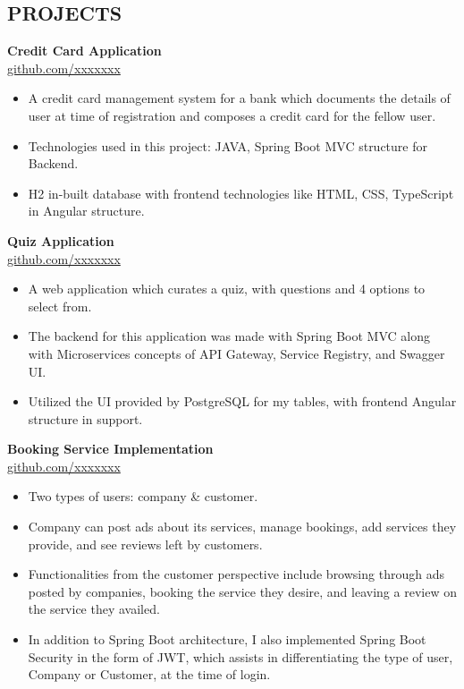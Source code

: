 \documentclass[a4paper,10pt]{article}
\begin{document}
\begin{multicols}{2}
\section*{PROJECTS}
\noindent
\textbf{Credit Card Application} \\
\href{https://github.com/xxxxxxx}{github.com/xxxxxxx} \\
\vspace{0.2em}
\begin{itemize}[leftmargin=*, itemsep=0pt, parsep=0pt, topsep=0pt]
    \item A credit card management system for a bank which documents the details of user at time of registration and composes a credit card for the fellow user.
    \item Technologies used in this project: JAVA, Spring Boot MVC structure for Backend.
    \item H2 in-built database with frontend technologies like HTML, CSS, TypeScript in Angular structure.
\end{itemize}

\vspace{0.5em}
\noindent
\textbf{Quiz Application} \\
\href{https://github.com/xxxxxxx}{github.com/xxxxxxx} \\
\vspace{0.2em}
\begin{itemize}[leftmargin=*, itemsep=0pt, parsep=0pt, topsep=0pt]
    \item A web application which curates a quiz, with questions and 4 options to select from.
    \item The backend for this application was made with Spring Boot MVC along with Microservices concepts of API Gateway, Service Registry, and Swagger UI.
    \item Utilized the UI provided by PostgreSQL for my tables, with frontend Angular structure in support.
\end{itemize}

\vspace{0.5em}
\noindent
\textbf{Booking Service Implementation} \\
\href{https://github.com/xxxxxxx}{github.com/xxxxxxx} \\
\vspace{0.2em}
\begin{itemize}[leftmargin=*, itemsep=0pt, parsep=0pt, topsep=0pt]
    \item Two types of users: company & customer.
    \item Company can post ads about its services, manage bookings, add services they provide, and see reviews left by customers.
    \item Functionalities from the customer perspective include browsing through ads posted by companies, booking the service they desire, and leaving a review on the service they availed.
    \item In addition to Spring Boot architecture, I also implemented Spring Boot Security in the form of JWT, which assists in differentiating the type of user, Company or Customer, at the time of login.
\end{itemize}
\end{multicols}
\end{document}
